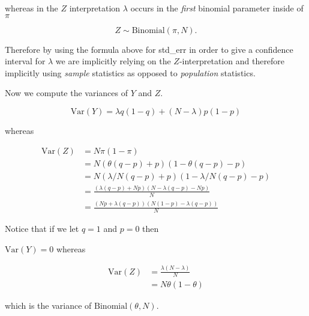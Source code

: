 \documentclass[oneside,12pt]{amsart}
\begin{document}
whereas in the $Z$ interpretation $\lambda$ occurs in the \emph{first}
binomial parameter inside of $\pi$

$$Z\sim\text{Binomial}(\pi, N).$$

Therefore by using the formula above for std\_err in order to give a confidence
interval for $\lambda$ we are implicitly relying on the $Z$-interpretation
and therefore implicitly using \emph{sample} statistics as opposed to
\emph{population} statistics.

Now we compute the variances of $Y$ and $Z$.

$$ \text{Var}(Y) = \lambda q (1-q) + (N-\lambda) p (1 - p) $$

whereas

\begin{equation}
\begin{split}
\text{Var}(Z) &= N \pi (1 - \pi) \\
 & = N (\theta(q-p) + p)(1 - \theta(q-p) - p) \\
 & = N (\lambda/N(q-p) + p)(1 - \lambda/N(q-p) - p) \\
 & = \frac{(\lambda(q-p) + N p)(N - \lambda(q-p) - N p)}{N} \\
 & = \frac{(N p + \lambda(q-p))(N (1- p) - \lambda(q-p))}{N}
\end{split}
\end{equation}

Notice that if we let $q = 1$ and $p = 0$ then

$\text{Var}(Y) = 0$ whereas

\begin{equation}
\begin{split}
\text{Var}(Z) &= \frac{\lambda (N - \lambda)}{N} \\
 & = N \theta (1 - \theta)
\end{split}
\end{equation}

which is the variance of $\text{Binomial}(\theta, N)$.
\end{document}
